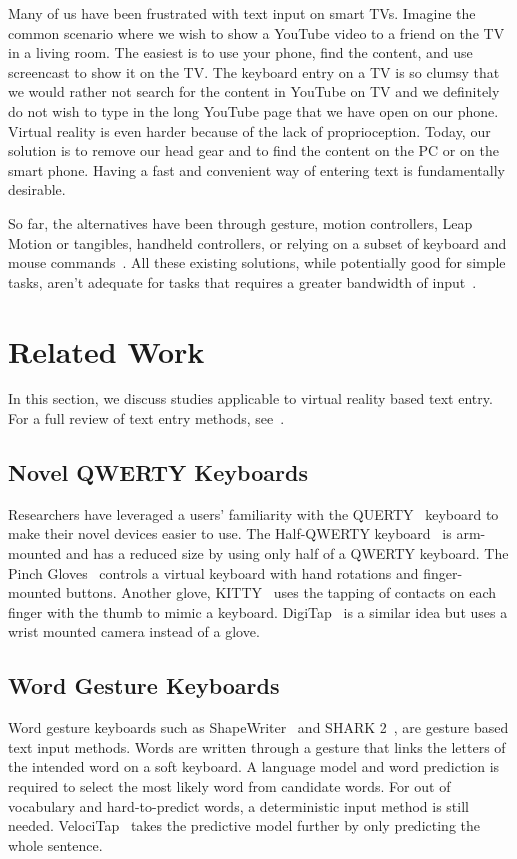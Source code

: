 \documentclass{sigchi}
\begin{document}
Many of us have been frustrated with text input on smart TVs. Imagine the common scenario where we wish to show a YouTube video to a friend on the TV in a living room.
The easiest is to use your phone, find the content, and use screencast to show it on the TV.
The keyboard entry on a TV is so clumsy that we would rather not search for the content in YouTube on TV and we definitely do not wish to type in the long YouTube page that we have open on our phone.
Virtual reality is even harder because of the lack of proprioception.
Today, our solution is to remove our head gear and to find the content on the PC or on the smart phone.
Having a fast and convenient way of entering text is fundamentally desirable.

So far, the alternatives have been through gesture, motion controllers, Leap Motion or tangibles, handheld controllers, or relying on a subset of keyboard and mouse commands~\cite{billinghurst1999collaborative}.
All these existing solutions, while potentially good for simple tasks, aren't adequate for tasks that requires a greater bandwidth of input~\cite{McGill:2015:DRO:2702123.2702382}.

\section{Related Work}

In this section, we discuss studies applicable to virtual reality based text entry.
For a full review of text entry methods, see~\cite{mackenzie2002text, zhai2005search, Buxton2011}.

\subsection{Novel QWERTY Keyboards}
Researchers have leveraged a users' familiarity with the QUERTY~\cite{noyes1983qwerty} keyboard to make their novel devices easier to use.
The Half-QWERTY keyboard~\cite{matias1993half} is arm-mounted and has a reduced size by using only half of a QWERTY keyboard.
The Pinch Gloves~\cite{bowman2002text} controls a virtual keyboard with hand rotations and finger-mounted buttons.
Another glove, KITTY~\cite{Kuester:2005:TKI:1101616.1101635} uses the tapping of contacts on each finger with the thumb to mimic a keyboard.
DigiTap~\cite{Pratorius:2014:DEV:2671015.2671029} is a similar idea but uses a wrist mounted camera instead of a glove.

\subsection{Word Gesture Keyboards}
Word gesture keyboards such as ShapeWriter~\cite{zhai2012word,Zhai:2009:SIL:1520340.1520380} and SHARK 2~\cite{kristensson2004shark}, are gesture based text input methods.
Words are written through a gesture that links the letters of the intended word on a soft keyboard. A language model and word prediction is required to select the most likely word from  candidate words.
For out of vocabulary and hard-to-predict words, a deterministic input method is still needed.
VelociTap~\cite{vertanen2015velocitap} takes the predictive model further by only predicting the whole sentence.
\end{document}
